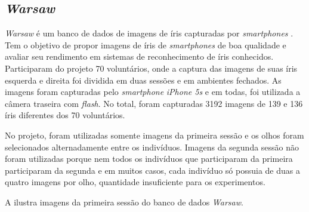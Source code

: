 \subsection{\textit{\acrshort{Warsaw}}}\label{sec:experimentos:db:warsaw}

\par \textit{\acrshort{Warsaw}} é um banco de dados de imagens de íris capturadas por \textit{smartphones} \cite{trokielwicz2016-Warsaw}. Tem o objetivo de propor imagens de íris de \textit{smartphones} de boa qualidade e avaliar seu rendimento em sistemas de reconhecimento de íris conhecidos. Participaram do projeto 70 voluntários, onde a captura das imagens de suas íris esquerda e direita foi dividida em duas sessões e em ambientes fechados. As imagens foram capturadas pelo \textit{smartphone} \textit{iPhone 5s} e em todas, foi utilizada a câmera traseira com \textit{flash}. No total, foram capturadas 3192 imagens de 139 e 136 íris diferentes dos 70 voluntários.

\par No projeto, foram utilizadas somente imagens da primeira sessão e os olhos foram selecionados alternadamente entre os indivíduos. Imagens da segunda sessão não foram utilizadas porque nem todos os indivíduos que participaram da primeira participaram da segunda e em muitos casos, cada indivíduo só possuia de duas a quatro imagens por olho, quantidade insuficiente para os experimentos.

\par A  ilustra imagens da primeira sessão do banco de dados \textit{\acrshort{Warsaw}}.

